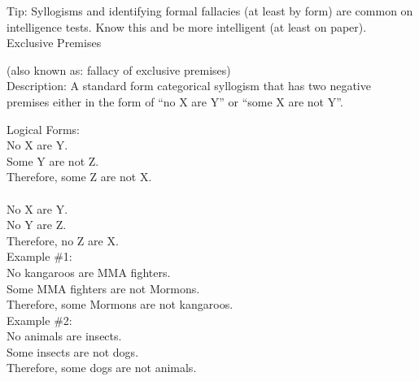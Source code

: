 \documentclass[a4paper,12pt,single,pdftex]{scrbook}
\begin{document}
    
      Tip: Syllogisms and identifying formal fallacies (at least by form) are common on intelligence tests. Know this and be more intelligent (at least on paper).
    \\

  

Exclusive Premises
    
      (also known as: fallacy of exclusive premises)
    \\

  
    Description: A standard form categorical syllogism that has two negative premises either in the form of  “no X are Y” or “some X are not Y”.

    
      Logical Forms:
    \\

    
      No X are Y.
    \\

    
      Some Y are not Z.
    \\

    
      Therefore, some Z are not X.
    \\

    
       
    \\

    
      No X are Y.
    \\

    
      No Y are Z.
    \\

    
      Therefore, no Z are X.
    \\

    
      Example \#1:
    \\

    
      No kangaroos are MMA fighters.
    \\

    
      Some MMA fighters are not Mormons.
    \\

    
      Therefore, some Mormons are not kangaroos.
    \\

    
      Example \#2:
    \\

    
      No animals are insects.
    \\

    
      Some insects are not dogs.
    \\

    
      Therefore, some dogs are not animals.
    \\
\end{document}
